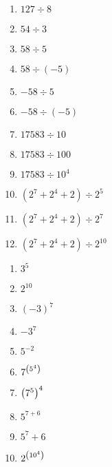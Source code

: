 \begin{multicols}{2}
  \begin{enumerate}[label=\emph{\alph*)}]
    \item $127 \div 8$
    \item $54 \div 3$
    \item $58 \div 5$
    \item $58 \div (-5)$
    \item $-58 \div 5$
    \item $-58 \div (-5)$
    \item $17583 \div 10$
    \item $17583 \div 100$
    \item $17583 \div 10^4$
    \item $(2^7+2^4+2) \div 2^5$
    \item $(2^7+2^4+2) \div 2^7$
    \item $(2^7+2^4+2) \div 2^{10}$
  \end{enumerate}
\end{multicols}
\begin{multicols}{2}
  \begin{enumerate}[label=\emph{\alph*)}]
    \item $3^5$
    \item $2^{10}$
    \item $(-3)^7$
    \item $-3^7$
    \item $5^{-2}$
    \item $7^{\left( 5^4\right)}$
    \item $\left( 7^5\right)^4$
    \item $5^{7+6}$
    \item $5^7+6$
    \item $2^{\left( 10^4\right)}$
  \end{enumerate}
\end{multicols}

